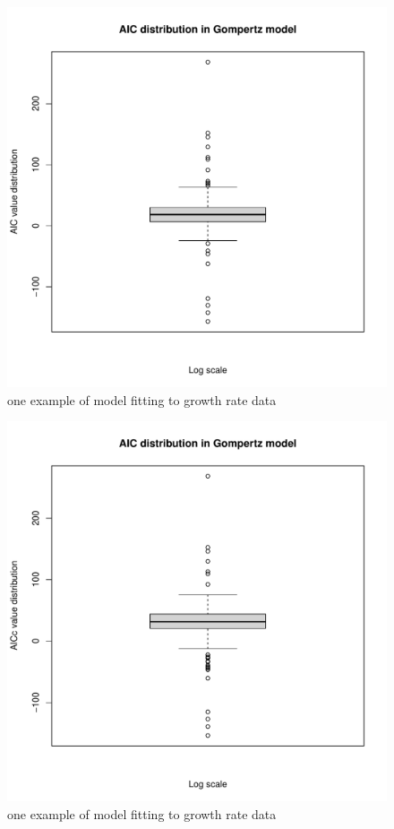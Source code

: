 \documentclass[11pt]{article}
\begin{document}
\begin{figure}[H]
    \centering
    \includegraphics[scale=0.3]{GomAIC_Log.pdf}
    \caption{one example of model fitting to growth rate data}
    \label{fig.9}
\end{figure}

\begin{figure}[H]
    \centering
    \includegraphics[scale=0.3]{GomAICc_Log.pdf}
    \caption{one example of model fitting to growth rate data}
    \label{fig.10}
\end{figure}
\end{document}
